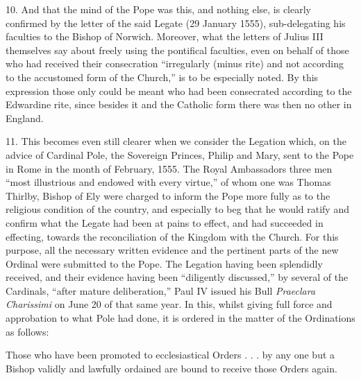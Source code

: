 10. And that the mind of the Pope was this, and nothing else, is clearly
confirmed by the letter of the said Legate (29 January 1555),
sub-delegating his faculties to the Bishop of Norwich. Moreover, what
the letters of Julius III themselves say about freely using the
pontifical faculties, even on behalf of those who had received their
consecration ``irregularly (minus rite) and not according to the
accustomed form of the Church,'' is to be especially noted. By this
expression those only could be meant who had been consecrated according
to the Edwardine rite, since besides it and the Catholic form there was
then no other in England.

11. This becomes even still clearer when we consider the Legation which,
on the advice of Cardinal Pole, the Sovereign Princes, Philip and Mary,
sent to the Pope in Rome in the month of February, 1555. The Royal
Ambassadors three men ``most illustrious and endowed with every
virtue,'' of whom one was Thomas Thirlby, Bishop of Ely were charged to
inform the Pope more fully as to the religious condition of the country,
and especially to beg that he would ratify and confirm what the Legate
had been at pains to effect, and had succeeded in effecting, towards the
reconciliation of the Kingdom with the Church. For this purpose, all the
necessary written evidence and the pertinent parts of the new Ordinal
were submitted to the Pope. The Legation having been splendidly
received, and their evidence having been ``diligently discussed,'' by
several of the Cardinals, ``after mature deliberation,'' Paul IV issued
his Bull \emph{Praeclara Charissimi} on June 20 of that same year. In
this, whilst giving full force and approbation to what Pole had done, it
is ordered in the matter of the Ordinations as follows:

Those who have been promoted to ecclesiastical Orders . . . by any one
but a Bishop validly and lawfully ordained are bound to receive those
Orders again.

